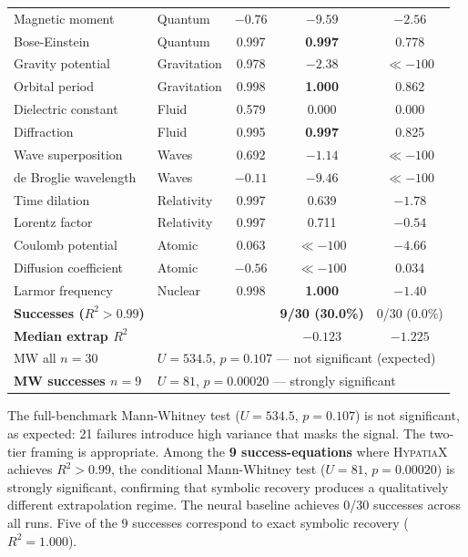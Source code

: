 \documentclass[twoside,11pt]{article}
\newcommand{\Rsq}{R^{2}}
\begin{document}
\begin{table}[h]
\begin{tabular}{llccc}
Magnetic moment           & Quantum        & $-0.76$ & $-9.59$          & $-2.56$ \\
Bose-Einstein             & Quantum        & 0.997 & \textbf{0.997}     & 0.778 \\
Gravity potential         & Gravitation    & 0.978 & $-2.38$            & $\ll{-}100$ \\
Orbital period            & Gravitation    & 0.998 & \textbf{1.000}     & 0.862 \\
Dielectric constant       & Fluid          & 0.579 & 0.000              & 0.000 \\
Diffraction               & Fluid          & 0.995 & \textbf{0.997}     & 0.825 \\
Wave superposition        & Waves          & 0.692 & $-1.14$            & $\ll{-}100$ \\
de Broglie wavelength     & Waves          & $-0.11$ & $-9.46$          & $\ll{-}100$ \\
Time dilation             & Relativity     & 0.997 & 0.639              & $-1.78$ \\
Lorentz factor            & Relativity     & 0.997 & 0.711              & $-0.54$ \\
Coulomb potential         & Atomic         & 0.063 & $\ll{-}100$        & $-4.66$ \\
Diffusion coefficient     & Atomic         & $-0.56$ & $\ll{-}100$      & 0.034 \\
Larmor frequency          & Nuclear        & 0.998 & \textbf{1.000}     & $-1.40$ \\
\midrule\midrule
\textbf{Successes ($\Rsq>0.99$)} & & & \textbf{9/30 (30.0\%)} & 0/30 (0.0\%) \\
\textbf{Median extrap $\Rsq$}    & & & $-0.123$               & $-1.225$ \\
MW all $n=30$       & \multicolumn{4}{l}{$U=534.5$, $p=0.107$ — not significant (expected)} \\
\textbf{MW successes $n=9$} & \multicolumn{4}{l}{$U=81$, $p=\mathbf{0.00020}$ — strongly significant} \\
\bottomrule
\end{tabular}
\end{table}

The full-benchmark Mann-Whitney test ($U=534.5$, $p=0.107$) is not significant,
as expected: 21 failures introduce high variance that masks the signal.  The
two-tier framing is appropriate.  Among the \textbf{9 success-equations} where
\textsc{HypatiaX} achieves $\Rsq > 0.99$, the conditional Mann-Whitney test
($U=81$, $p=0.00020$) is strongly significant, confirming that symbolic recovery
produces a qualitatively different extrapolation regime.  The neural baseline
achieves 0/30 successes across all runs.  Five of the 9 successes correspond to
exact symbolic recovery ($\Rsq = 1.000$).
\end{document}
